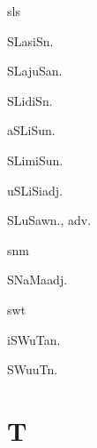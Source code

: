 \begin{multicols*}{2}
\begin{dictroot}{sl}{s}
    \begin{dictentry}{SLasiS}{n.}
    \end{dictentry}
    \begin{dictentry}{SLajuSa}{n.}
    \end{dictentry}
    \begin{dictentry}{SLidiS}{n.}
    \end{dictentry}
    \begin{dictentry}{aSLiSu}{n.}
    \end{dictentry}
    \begin{dictentry}{SLimiSu}{n.}
    \end{dictentry}
    \begin{dictentry}{uSLiSi}{adj.}
    \end{dictentry}
    \begin{dictentry}{SLuSaw}{n., adv.}
    \end{dictentry}
\end{dictroot}

\begin{dictroot}{sn}{m}
    \begin{dictentry}{SNaMa}{adj.}
    \end{dictentry}
\end{dictroot}

\begin{dictroot}{sw}{t}
    \begin{dictentry}{iSWuTa}{n.}
    \end{dictentry}
    \begin{dictentry}{SWuuT}{n.}
    \end{dictentry}
\end{dictroot}

\section*{T}


\end{multicols*}

